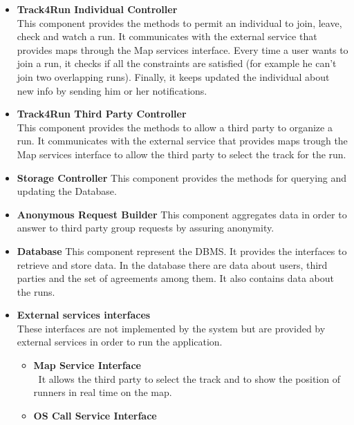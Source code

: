 \begin{legal}
\begin{itemize}
{		This component provides authentication and registration processes for both the individuals and the third parties.
				}\\
		\item{\textbf{Track4Run Individual Controller}\\
		This component provides the methods to permit an individual to join, leave, check and watch a run. It communicates with the external service that provides maps through the Map services interface. Every time a user wants to join a run, it checks if all the constraints are satisfied (for example he can't join two overlapping runs). Finally, it keeps updated the individual about new info by sending him or her notifications.
				}\\
		\item{\textbf{Track4Run Third Party Controller}\\
		This component provides the methods to allow a third party to organize a run. It communicates with the external service that provides maps trough the Map services interface to allow the third party to select the track for the run.
				}\\				
		\item{\textbf{Storage Controller}
		This component provides the methods for querying and updating the Database.
				}\\
		\item{\textbf{Anonymous Request Builder}
		This component aggregates data in order to answer to third party group requests by assuring anonymity.
				}\\
		\item{\textbf{Database}
		This component represent the DBMS. It provides the interfaces to retrieve and store data. In the database there are data about users, third parties and the set of agreements among them. It also contains data about the runs.
				}\\
		\item{\textbf{External services interfaces}\\
		These interfaces are not implemented by the system but are provided by external services in order to run the application.
      	\begin{itemize}
		  	\item{\textbf{Map Service Interface}\\\
		  	It allows the third party to select the track and to show the position of runners in real time on the map.
						}\\
			\item{\textbf{OS Call Service Interface}\\
}
\end{itemize}}
\end{itemize}
\end{legal}
